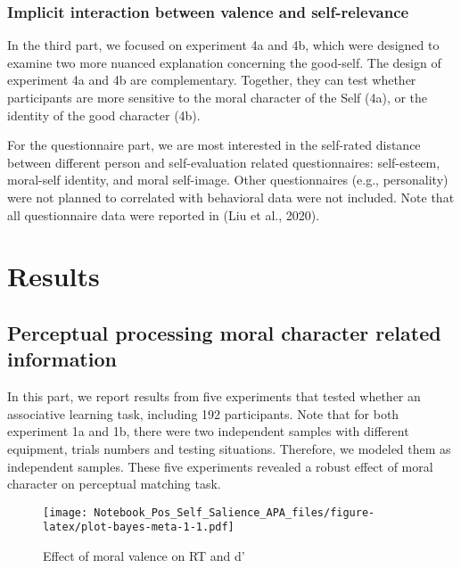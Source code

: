 \documentclass[
  english,
  man]{apa6}
\begin{document}
\hypertarget{implicit-interaction-between-valence-and-self-relevance}{%
\subsubsection{Implicit interaction between valence and self-relevance}\label{implicit-interaction-between-valence-and-self-relevance}}

In the third part, we focused on experiment 4a and 4b, which were designed to examine two more nuanced explanation concerning the good-self. The design of experiment 4a and 4b are complementary. Together, they can test whether participants are more sensitive to the moral character of the Self (4a), or the identity of the good character (4b).

For the questionnaire part, we are most interested in the self-rated distance between different person and self-evaluation related questionnaires: self-esteem, moral-self identity, and moral self-image. Other questionnaires (e.g., personality) were not planned to correlated with behavioral data were not included. Note that all questionnaire data were reported in (Liu et al., 2020).

\hypertarget{results}{%
\section{Results}\label{results}}

\hypertarget{perceptual-processing-moral-character-related-information}{%
\subsection{Perceptual processing moral character related information}\label{perceptual-processing-moral-character-related-information}}

In this part, we report results from five experiments that tested whether an associative learning task, including 192 participants. Note that for both experiment 1a and 1b, there were two independent samples with different equipment, trials numbers and testing situations. Therefore, we modeled them as independent samples. These five experiments revealed a robust effect of moral character on perceptual matching task.

\begin{figure}
\centering
\texttt{[image: Notebook\_Pos\_Self\_Salience\_APA\_files/figure-latex/plot-bayes-meta-1-1.pdf]}
\caption{\label{fig:plot-bayes-meta-1}Effect of moral valence on RT and d'}
\end{figure}
\end{document}
